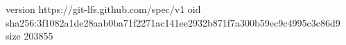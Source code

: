 version https://git-lfs.github.com/spec/v1
oid sha256:3f1082a1de28aab0ba71f2271ac141ee2932b871f7a300b59ec9c4995c3c86d9
size 203855

